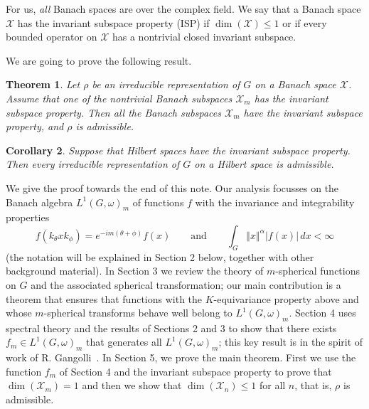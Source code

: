 \documentclass[12pt,a4paper]{amsart}
\newtheorem{thm}{Theorem}[section]
\newtheorem{cor}[thm]{Corollary}
\theoremstyle{definition}
\theoremstyle{remark}
\numberwithin{equation}{section}
\newcommand{\norm}[1]{\left\Vert#1\right\Vert}
\newcommand{\abs}[1]{\left\vert#1\right\vert}
\newcommand{\Ban}{\mathcal{X}}
\newcommand{\rep}{\rho}
\begin{document}
For us, \emph{all} Banach spaces are  over the complex field.
We say that a Banach space $\Ban$ has the invariant subspace property (ISP) if $\dim(\Ban) \leq 1$ or if every bounded operator on $\Ban$ has a nontrivial closed invariant subspace.


We are going to prove the following result.



\begin{thm}\label{thm:main}
Let $\rep$ be an irreducible representation of $G$ on a Banach space $\Ban$.
Assume that one of the nontrivial Banach subspaces $\Ban_m$ has the invariant subspace property.
Then all the Banach subspaces $\Ban_m$ have
 the invariant subspace property, and $\rep$  is admissible.
\end{thm}

\begin{cor}\label{cor:Hilbert}
Suppose that Hilbert spaces have the invariant subspace property.
Then every irreducible representation of $G$ on a Hilbert space is admissible.
\end{cor}
\color{black}

We give the proof towards the end of this note.
Our analysis focusses on the Banach algebra $L^1(G,\omega)_m$ of functions $f$ with the invariance and integrability properties
\begin{equation*}
f(k_\theta x k_\phi) = e^{-i m(\theta+\phi)} f(x)
\qquad\text{and}\qquad
\int_G \norm{x}^\alpha \abs{f(x)}  \,dx < \infty
\end{equation*}
(the notation will be explained in Section 2 below, together with other background material).
In Section 3 we review the theory of $m$-spherical functions on $G$ and the associated spherical transformation; our main contribution
is a theorem that ensures that functions with the $K$-equivariance property above and whose $m$-spherical transforms behave well belong to $L^1(G,\omega)_m$.
Section 4 uses spectral theory and the results of Sections 2 and 3 to show that there exists $f_m \in L^1(G,\omega)_{m}$ that generates all $L^1(G,\omega)_{m}$; this key result is in the spirit of work of R. Gangolli~\cite{Gan}. 
In Section 5, we prove the main theorem.
First we use the function $f_m$ of Section 4 and the invariant subspace property to prove that $\dim(\Ban_m) = 1$ and then we show that $\dim(\Ban_n) \leq 1$ for all $n$, that is, $\rep$ is admissible. 
\end{document}
